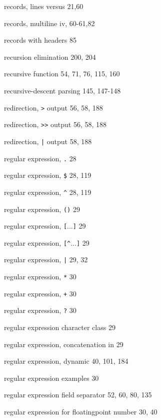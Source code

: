 \begin{multicols}{3}
\hangindent=3pc  records, lines versus 21,60

\hangindent=3pc  records, multiline iv, 60-61,82

\hangindent=3pc  records with headers 85

\hangindent=3pc  recursion elimination 200, 204

\hangindent=3pc  recursive function 54, 71, 76, 115, 160

\hangindent=3pc  recursive-descent parsing 145, 147-148

\hangindent=3pc  redirection, \verb'>' output 56, 58, 188

\hangindent=3pc  redirection, \verb'>>' output 56, 58, 188

\hangindent=3pc  redirection, \verb'|' output 58, 188

\hangindent=3pc  regular expression, \verb'.' 28

\hangindent=3pc  regular expression, \verb'$' 28, 119

\hangindent=3pc  regular expression, \verb'^' 28, 119

\hangindent=3pc  regular expression, \verb'()' 29

\hangindent=3pc  regular expression, \verb'['...\verb']' 29

\hangindent=3pc  regular expression, \verb'[^'...\verb']' 29

\hangindent=3pc  regular expression, \verb'|' 29, 32

\hangindent=3pc  regular expression, \verb'*' 30

\hangindent=3pc  regular expression, \verb'+' 30

\hangindent=3pc  regular expression, \verb'?' 30

\hangindent=3pc  regular expression character class 29

\hangindent=3pc  regular expression, concatenation in 29

\hangindent=3pc  regular expression, dynamic 40, 101, 184

\hangindent=3pc  regular expression examples 30

\hangindent=3pc  regular expression field separator 52, 60, 80, 135

\hangindent=3pc  regular expression for floatingpoint number 30, 40




\end{multicols}
